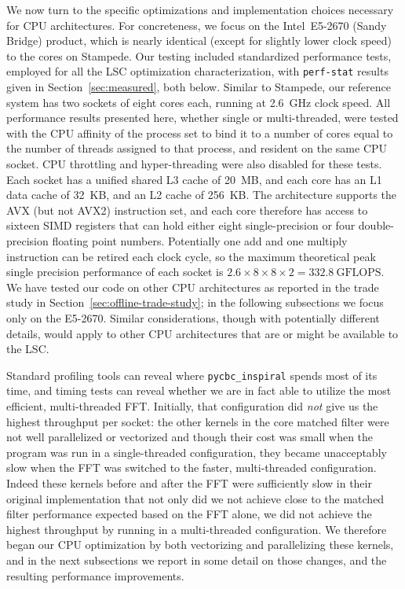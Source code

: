 We now turn to the specific optimizations and implementation choices necessary
for CPU architectures.  For concreteness, we focus on the
Intel\textsuperscript{\textregistered}~E5-2670 (Sandy Bridge) product, which is
nearly identical (except for slightly lower clock speed) to the cores on
Stampede. 
Our testing included standardized performance tests, employed for all the
LSC optimization characterization, with \texttt{perf-stat} results given in
Section~\ref{sec:measured}, both below.
Similar to Stampede, our reference system
has two sockets of eight cores each, running at 2.6~GHz clock speed. 
All performance results presented here, whether single or multi-threaded, were
tested with the CPU affinity of the process set to bind it to a number of cores
equal to the number of threads assigned to that process, and resident on the
same CPU socket.  CPU throttling and hyper-threading were also disabled for
these tests.
 Each
socket has a unified shared L3 cache of 20~MB, and each core has an L1 data
cache of 32~KB, and an L2 cache of 256~KB. The architecture supports the AVX
(but not AVX2) instruction set, and each core therefore has access to sixteen
SIMD registers that can hold either eight single-precision or four
double-precision floating point numbers. Potentially one add and one multiply
instruction can be retired each clock cycle, so the maximum theoretical peak
single precision performance of each socket is $2.6\times 8\times 8\times 2 =
332.8~\mathrm{GFLOPS}$. We have tested our code on other CPU architectures as
reported in the trade study in Section~\ref{sec:offline-trade-study}; in the following subsections we focus only on the
E5-2670. Similar considerations, though with potentially different details,
would apply to other CPU architectures that are or might be available to the
LSC.

Standard profiling tools can reveal where \texttt{pycbc\_inspiral} spends most of
its time, and timing tests can reveal whether we are in fact able to utilize the
most efficient, multi-threaded FFT.  Initially, that configuration did
\emph{not} give us the highest throughput per socket: the other kernels in the
core matched filter were not well parallelized or vectorized and though their
cost was small when the program was run in a single-threaded configuration, they
became unacceptably slow when the FFT was switched to the faster, multi-threaded
configuration. Indeed these kernels before and after the FFT were sufficiently
slow in their original implementation that not only did we not achieve close to
the matched filter performance expected based on the FFT alone, we did not
achieve the highest throughput by running in a multi-threaded
configuration. We therefore began our CPU optimization by both vectorizing and
parallelizing these kernels, and in the next subsections we report in some
detail on those changes, and the resulting performance improvements.

